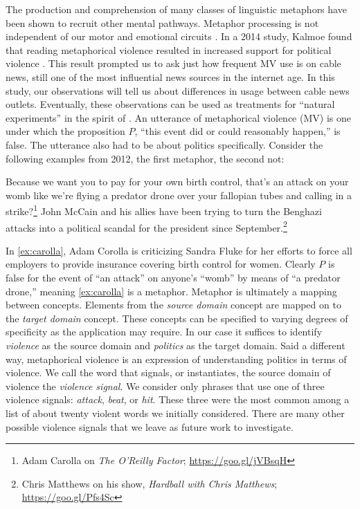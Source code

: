 The production and
comprehension of many classes of linguistic metaphors have been shown to 
recruit other mental pathways. Metaphor processing is not independent of
our motor and emotional circuits \cite{Gallese2005,Lakoff2014,Gibbs2017a}.
In a 2014 study, Kalmoe found that reading metaphorical violence 
resulted in increased support for political violence \cite{Kalmoe2014}. 
This result prompted us to ask just how frequent MV use is on
cable news, still one of the most influential news sources in the internet age. 
In this study, our observations will tell us about differences
in usage between cable news outlets. Eventually, these observations can be
used as treatments for ``natural experiments'' in the 
spirit of \cite{Fusaroli2015}. 
An utterance of metaphorical violence (MV) is one under which the proposition $P$, 
``this event did or could reasonably happen,'' is false.  The utterance
also had to be about politics specifically.
Consider the following examples from 2012, the first metaphor, the second not:
\begin{exe}
  \ex Because we want you to pay for your own birth control, that's an 
    attack on your womb like we're flying a predator drone over your 
    fallopian tubes and calling in a strike?\footnote{Adam 
    Carolla on \emph{The O'Reilly Factor}; \url{https://goo.gl/jVBsqH}} 
    \label{ex:carolla}
  \ex John McCain and his allies have been trying to turn the Benghazi 
    attacks into a political scandal for the president since 
    September.\footnote{Chris Matthews on his show, \emph{Hardball with Chris Matthews}; 
    \url{https://goo.gl/Pfs4Sc}} \label{ex:benghazi-attacks}
\end{exe}
In \ref{ex:carolla}, Adam Corolla is criticizing Sandra Fluke for her efforts to 
force all employers to provide insurance covering birth control for women. 
Clearly $P$ is false for the event of ``an attack'' on anyone's ``womb'' by
means of ``a predator drone,'' meaning \ref{ex:carolla} is a metaphor.
Metaphor is ultimately a mapping between concepts. 
Elements from the \emph{source domain} concept are mapped on to the \emph{target domain} 
concept. These concepts can be specified to varying degrees of specificity as
the application may require. In our case it suffices to identify \emph{violence}
as the source domain and \emph{politics} as the target domain. Said a different
way, metaphorical violence is an expression of understanding politics in
terms of violence. We call the word that signals, or instantiates, the source
domain of violence the \emph{violence signal}. We consider only phrases that
use one of three violence signals: \emph{attack}, \emph{beat}, or \emph{hit}. 
These three were the most common among a list of about twenty 
violent words we initially considered. There are many other possible violence 
signals that we leave as future work to investigate. 

